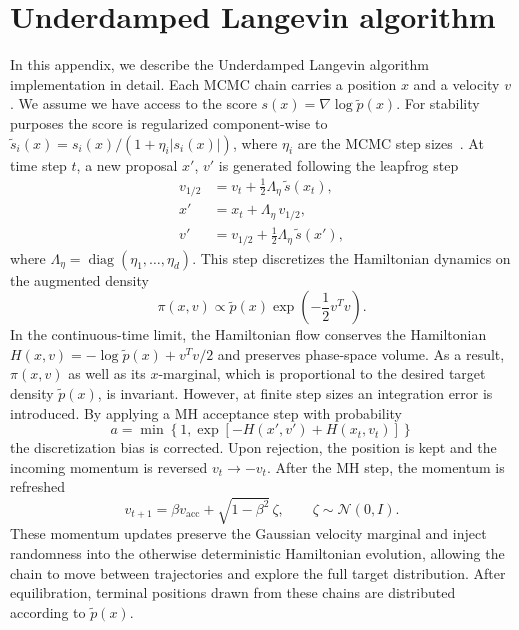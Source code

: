 \documentclass{article}
\begin{document}
\section{Underdamped Langevin algorithm}
\label{app:ula}
In this appendix, we describe the Underdamped Langevin algorithm implementation in detail.
Each MCMC chain carries a position $x$ and a velocity $v$.
We assume we have access to the score $s(x) = \nabla \log \widetilde{p}(x)$.
For stability purposes the score is regularized component-wise to $\widetilde{s}_i(x) = s_i(x) / (1 + \eta_i |s_i(x)|)$, where $\eta_i$ are the MCMC step sizes~\cite{brosse2019tamed}.
At time step $t$, a new proposal $x'$, $v'$ is generated following the leapfrog step
\begin{align}
  v_{1/2} &= v_t + \frac{1}{2}\Lambda_\eta \, \widetilde{s}(x_t), \nonumber \\
  x' &= x_t + \Lambda_\eta \, v_{1/2}, \nonumber \\
  v' &= v_{1/2} + \frac{1}{2}\Lambda_\eta \, \widetilde{s}(x'),
\end{align}
where $\Lambda_\eta=\operatorname{diag}(\eta_1,\ldots,\eta_d)$.
This step discretizes the Hamiltonian dynamics on the augmented density
\begin{equation}
  \pi(x,v) \propto \widetilde{p}(x)\exp\left(-\frac{1}{2}v^Tv\right).
\end{equation}
In the continuous-time limit, the Hamiltonian flow conserves the Hamiltonian $H(x,v) = -\log \widetilde{p}(x) + v^Tv/2$ and preserves phase-space volume.
As a result, $\pi(x,v)$ as well as its $x$-marginal, which is proportional to the desired target density $\widetilde{p}(x)$, is invariant.
However, at finite step sizes an integration error is introduced.
By applying a MH acceptance step with probability
\begin{equation}
  a = \min\left\{1, \exp\left[-H(x',v') + H(x_t,v_t)\right]\right\}
\end{equation}
the discretization bias is corrected.
Upon rejection, the position is kept and the incoming momentum is reversed $v_t \rightarrow -v_t$.
After the MH step, the momentum is refreshed
\begin{equation}
  v_{t+1} = \beta v_{\mathrm{acc}} + \sqrt{1-\beta^2}\,\zeta, \qquad \zeta \sim \mathcal{N}(0,I).
\end{equation}
These momentum updates preserve the Gaussian velocity marginal and inject randomness into the otherwise deterministic Hamiltonian evolution, allowing the chain to move between trajectories and explore the full target distribution.
After equilibration, terminal positions drawn from these chains are distributed according to $\widetilde{p}(x)$.
\end{document}
